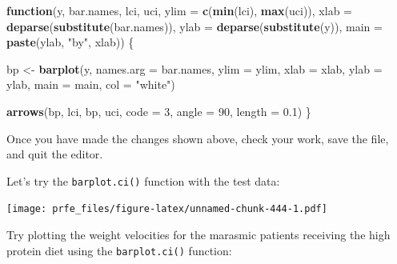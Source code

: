 \documentclass[12pt,a4paper]{book}
\newenvironment{Shaded}{\begin{snugshade}}{\end{snugshade}}
\newcommand{\ControlFlowTok}[1]{\textcolor[rgb]{0.13,0.29,0.53}{\textbf{#1}}}
\newcommand{\DataTypeTok}[1]{\textcolor[rgb]{0.13,0.29,0.53}{#1}}
\newcommand{\DecValTok}[1]{\textcolor[rgb]{0.00,0.00,0.81}{#1}}
\newcommand{\FloatTok}[1]{\textcolor[rgb]{0.00,0.00,0.81}{#1}}
\newcommand{\KeywordTok}[1]{\textcolor[rgb]{0.13,0.29,0.53}{\textbf{#1}}}
\newcommand{\NormalTok}[1]{#1}
\newcommand{\OperatorTok}[1]{\textcolor[rgb]{0.81,0.36,0.00}{\textbf{#1}}}
\newcommand{\StringTok}[1]{\textcolor[rgb]{0.31,0.60,0.02}{#1}}
\theoremstyle{definition}
\theoremstyle{definition}
\theoremstyle{definition}
\theoremstyle{remark}
\begin{document}
\begin{Shaded}
\begin{Highlighting}[]
\ControlFlowTok{function}\NormalTok{(y, bar.names, lci, uci,}
         \DataTypeTok{ylim =} \KeywordTok{c}\NormalTok{(}\KeywordTok{min}\NormalTok{(lci), }\KeywordTok{max}\NormalTok{(uci)),}
         \DataTypeTok{xlab =} \KeywordTok{deparse}\NormalTok{(}\KeywordTok{substitute}\NormalTok{(bar.names)),}
         \DataTypeTok{ylab =} \KeywordTok{deparse}\NormalTok{(}\KeywordTok{substitute}\NormalTok{(y)),}
         \DataTypeTok{main =} \KeywordTok{paste}\NormalTok{(ylab, }\StringTok{"by"}\NormalTok{, xlab)) \{}
     
\NormalTok{  bp <-}\StringTok{ }\KeywordTok{barplot}\NormalTok{(y, }\DataTypeTok{names.arg =}\NormalTok{ bar.names, }\DataTypeTok{ylim =}\NormalTok{ ylim, }\DataTypeTok{xlab =}\NormalTok{ xlab,}
                \DataTypeTok{ylab =}\NormalTok{ ylab, }\DataTypeTok{main =}\NormalTok{ main, }\DataTypeTok{col =} \StringTok{"white"}\NormalTok{)}
     
  \KeywordTok{arrows}\NormalTok{(bp, lci, bp, uci, }\DataTypeTok{code =} \DecValTok{3}\NormalTok{, }\DataTypeTok{angle =} \DecValTok{90}\NormalTok{, }\DataTypeTok{length =} \FloatTok{0.1}\NormalTok{)}
\NormalTok{\}}
\end{Highlighting}
\end{Shaded}

Once you have made the changes shown above, check your work, save the
file, and quit the editor.

Let's try the \texttt{barplot.ci()} function with the test data:

\begin{Shaded}
\end{Shaded}

\texttt{[image: prfe\_files/figure-latex/unnamed-chunk-444-1.pdf]}

Try plotting the weight velocities for the marasmic patients receiving
the high protein diet using the \texttt{barplot.ci()} function:

\begin{Shaded}
\end{Shaded}
\end{document}

